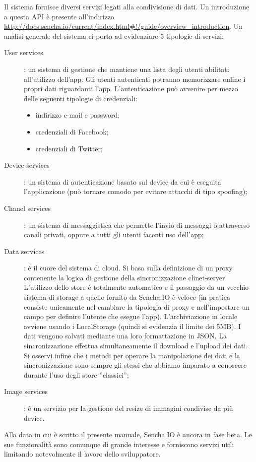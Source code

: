 \documentclass[10pt,a4paper,onecolumn]{article}
\begin{document}
Il sistema fornisce diversi servizi legati alla condivisione di dati. Un introduzione a questa API è presente all'indirizzo \url{http://docs.sencha.io/current/index.html#!/guide/overview_introduction}. Un analisi generale del sistema ci porta ad evidenziare 5 tipologie di servizi:

\begin{description}
	\item[User services]: un sistema di gestione che mantiene una lista degli utenti abilitati all'utilizzo dell'app. Gli utenti autenticati potranno memorizzare online i propri dati riguardanti l'app. L'autenticazione può avvenire per mezzo delle seguenti tipologie di credenziali:
		\begin{itemize}
			\item indirizzo e-mail e password;
			\item credenziali di Facebook;
			\item credenziali di Twitter;
		\end{itemize}
	\item[Device services]: un sistema di autenticazione basato sul device da cui è eseguita l'applicazione (può tornare comodo per evitare attacchi di tipo spoofing);
	\item[Chanel services]: un sistema di messaggistica che permette l'invio di messaggi o attraverso canali privati, oppure a tutti gli utenti facenti uso dell'app;
	\item[Data services]: è il cuore del sistema di cloud. Si basa sulla definizione di un proxy contenente la logica di gestione della sincronizzazione clinet-server. L'utilizzo dello store è totalmente automatico e il passaggio da un vecchio sistema di storage a quello fornito da Sencha.IO è veloce (in pratica consiste unicamente nel cambiare la tipologia di proxy e nell'impostare un campo per definire l'utente che esegue l'app). L'archiviazione in locale avviene usando i LocalStorage (quindi si evidenzia il limite dei 5MB). I dati vengono salvati mediante una loro formattazione in JSON. La sincronizzazione effettua simultaneamente il download e l'upload dei dati. Si osservi infine che i metodi per operare la manipolazione dei dati e la sincronizzazione sono sempre gli stessi che abbiamo imparato a conoscere durante l'uso degli store ''classici'';
	\item[Image services]: è un servizio per la gestione del resize di immagini condivise da più device.
\end{description}

Alla data in cui è scritto il presente manuale, Sencha.IO è ancora in fase beta. Le sue funzionalità sono comunque di grande interesse e forniscono servizi utili limitando notevolmente il lavoro dello sviluppatore.
\end{document}
